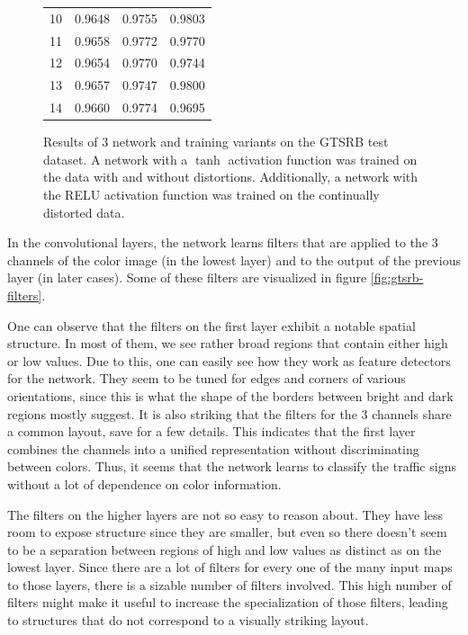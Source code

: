\documentclass[11pt, a4paper]{article}
\begin{document}
\begin{figure}[h!]
\begin{tabular}{|r|rrr|}
		10 & 0.9648 & 0.9755 & 0.9803 \\
		11 & 0.9658 & 0.9772 & 0.9770 \\
		12 & 0.9654 & 0.9770 & 0.9744 \\
		13 & 0.9657 & 0.9747 & 0.9800 \\
		14 & 0.9660 & 0.9774 & 0.9695 \\
		\hline
	\end{tabular}
	\caption{Results of 3 network and training variants on the GTSRB test dataset. A network with a $\tanh$ activation function was trained on the data with and without distortions. Additionally, a network with the RELU activation function was trained on the continually distorted data.}
	\label{fig:gtsrb-results}
\end{figure}

In the convolutional layers, the network learns filters that are applied to the 3 channels of the color image (in the lowest layer) and to the output of the previous layer (in later cases). Some of these filters are visualized in figure \ref{fig:gtsrb-filters}.

One can observe that the filters on the first layer exhibit a notable spatial structure. In most of them, we see rather broad regions that contain either high or low values. Due to this, one can easily see how they work as feature detectors for the network. They seem to be tuned for edges and corners of various orientations, since this is what the shape of the borders between bright and dark regions mostly suggest. It is also striking that the filters for the 3 channels share a common layout, save for a few details. This indicates that the first layer combines the channels into a unified representation without discriminating between colors. Thus, it seems that the network learns to classify the traffic signs without a lot of dependence on color information.

The filters on the higher layers are not so easy to reason about. They have less room to expose structure since they are smaller, but even so there doesn't seem to be a separation between regions of high and low values as distinct as on the lowest layer. Since there are a lot of filters for every one of the many input maps to those layers, there is a sizable number of filters involved. This high number of filters might make it useful to increase the specialization of those filters, leading to structures that do not correspond to a visually striking layout.
\end{document}

